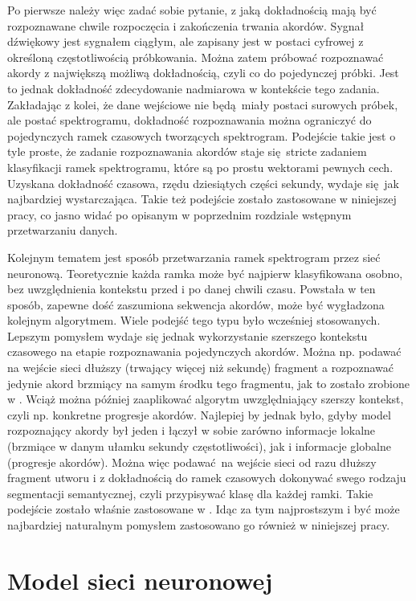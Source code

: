 Po pierwsze należy więc zadać sobie pytanie, z jaką dokładnością mają być rozpoznawane chwile
rozpoczęcia i zakończenia trwania akordów. Sygnał dźwiękowy jest sygnałem ciągłym, ale zapisany jest
w postaci cyfrowej z określoną częstotliwością próbkowania. Można zatem próbować rozpoznawać akordy
z największą możliwą dokładnością, czyli co do pojedynczej próbki. Jest to jednak dokładność
zdecydowanie nadmiarowa w kontekście tego zadania. Zakładając z kolei, że dane wejściowe nie
będą miały postaci surowych próbek, ale postać spektrogramu, dokładność rozpoznawania można
ograniczyć do pojedynczych ramek czasowych tworzących spektrogram. Podejście takie jest o tyle
proste, że zadanie rozpoznawania akordów staje się stricte zadaniem klasyfikacji ramek spektrogramu,
które są po prostu wektorami pewnych cech. Uzyskana dokładność czasowa, rzędu dziesiątych części
sekundy, wydaje się jak najbardziej wystarczająca. Takie też podejście zostało zastosowane w
niniejszej pracy, co jasno widać po opisanym w poprzednim rozdziale wstępnym przetwarzaniu danych.

Kolejnym tematem jest sposób przetwarzania ramek spektrogram przez sieć neuronową. Teoretycznie
każda ramka może być najpierw klasyfikowana osobno, bez uwzględnienia kontekstu przed i po danej
chwili czasu. Powstała w ten sposób, zapewne dość zaszumiona sekwencja akordów, może być wygładzona
kolejnym algorytmem. Wiele podejść tego typu było wcześniej stosowanych. Lepszym pomysłem wydaje się
jednak wykorzystanie szerszego kontekstu czasowego na etapie rozpoznawania pojedynczych akordów.
Można np.  podawać na wejście sieci dłuższy (trwający więcej niż sekundę) fragment a rozpoznawać
jedynie akord brzmiący na samym środku tego fragmentu, jak to zostało zrobione w
\cite{korzeniowski_fully_2016}.  Wciąż można później zaaplikować algorytm uwzględniający szerszy
kontekst, czyli np. konkretne progresje akordów. Najlepiej by jednak było, gdyby model rozpoznający
akordy był jeden i łączył w sobie zarówno informacje lokalne (brzmiące w danym ułamku sekundy
częstotliwości), jak i informacje globalne (progresje akordów). Można więc podawać na wejście sieci
od razu dłuższy fragment utworu i z dokładnością do ramek czasowych dokonywać swego rodzaju
segmentacji semantycznej, czyli przypisywać klasę dla każdej ramki. Takie podejście zostało właśnie
zastosowane w \cite{park_bi-directional_2019}. Idąc za tym najprostszym i być może najbardziej
naturalnym pomysłem zastosowano go również w niniejszej pracy. 



\section{Model sieci neuronowej}

